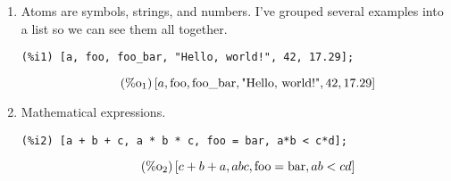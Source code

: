 \documentclass[12pt,leqno]{article}
\begin{document}
\begin{enumerate}

\item Atoms are symbols, strings, and numbers.
I've grouped several examples into a list so we can see them all together.
\begin{verbatim}
(%i1) [a, foo, foo_bar, "Hello, world!", 42, 17.29];
\end{verbatim}
\begin{equation}
\tag{$\mathop{\mathrm{\%o}}_{1}$}\left[a, \mathop{\mathrm{foo}}, \mathop{\mathrm{foo\_bar}}, \mbox{"Hello, world!"}, 42, 17.29\right]
\label{eq:doc-group1-code6-1}
\end{equation}

\item Mathematical expressions.
\begin{verbatim}
(%i2) [a + b + c, a * b * c, foo = bar, a*b < c*d];
\end{verbatim}
\begin{equation}
\tag{$\mathop{\mathrm{\%o}}_{2}$}\left[c+b+a, a b c, \mathop{\mathrm{foo}} = \mathop{\mathrm{bar}}, a b < c d\right]
\label{eq:doc-group1-code7-1}
\end{equation}



\end{enumerate}
\end{document}

